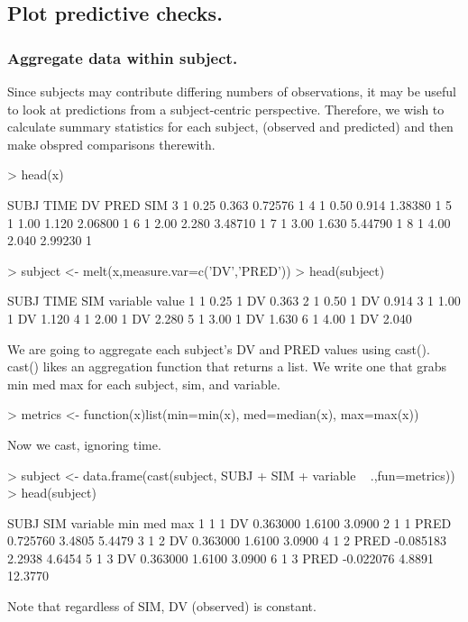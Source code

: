 \subsection{Plot predictive checks.}
\subsubsection{Aggregate data within subject.}
Since subjects may contribute differing numbers of observations, it may
be useful to look at predictions from a subject-centric perspective.
Therefore, we wish to calculate summary statistics for each subject, 
(observed and predicted) and then make obspred comparisons therewith.
\begin{Schunk}
\begin{Sinput}
> head(x)
\end{Sinput}
\begin{Soutput}
  SUBJ TIME    DV    PRED SIM
3    1 0.25 0.363 0.72576   1
4    1 0.50 0.914 1.38380   1
5    1 1.00 1.120 2.06800   1
6    1 2.00 2.280 3.48710   1
7    1 3.00 1.630 5.44790   1
8    1 4.00 2.040 2.99230   1
\end{Soutput}
\begin{Sinput}
> subject <- melt(x,measure.var=c('DV','PRED'))
> head(subject)
\end{Sinput}
\begin{Soutput}
  SUBJ TIME SIM variable value
1    1 0.25   1       DV 0.363
2    1 0.50   1       DV 0.914
3    1 1.00   1       DV 1.120
4    1 2.00   1       DV 2.280
5    1 3.00   1       DV 1.630
6    1 4.00   1       DV 2.040
\end{Soutput}
\end{Schunk}
We are going to aggregate each subject's DV and PRED values using cast().
cast() likes an aggregation function that returns a list.
We write one that grabs min med max for each subject, sim, and variable.
\begin{Schunk}
\begin{Sinput}
> metrics <- function(x)list(min=min(x), med=median(x), max=max(x))
\end{Sinput}
\end{Schunk}
Now we cast, ignoring time.
\begin{Schunk}
\begin{Sinput}
> subject <- data.frame(cast(subject, SUBJ + SIM + variable ~ .,fun=metrics))
> head(subject)
\end{Sinput}
\begin{Soutput}
  SUBJ SIM variable       min    med     max
1    1   1       DV  0.363000 1.6100  3.0900
2    1   1     PRED  0.725760 3.4805  5.4479
3    1   2       DV  0.363000 1.6100  3.0900
4    1   2     PRED -0.085183 2.2938  4.6454
5    1   3       DV  0.363000 1.6100  3.0900
6    1   3     PRED -0.022076 4.8891 12.3770
\end{Soutput}
\end{Schunk}
Note that regardless of SIM, DV (observed) is constant.

